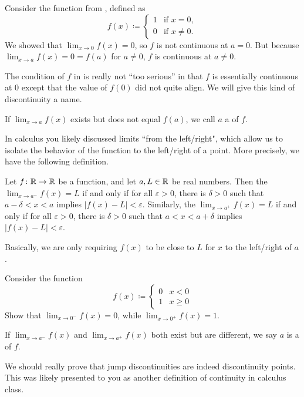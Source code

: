 \documentclass[../notes.tex]{subfiles}
\begin{document}
\begin{example} \label{ex:rem-discont-2}
    Consider the function from , defined as
    \[ f(x) \coloneqq \begin{cases}
        1 & \text{if }x=0, \\
        0 & \text{if }x\neq 0.
    \end{cases}\]
    We showed that $\lim_{x\to 0}f(x) =0$, so $f$ is not continuous at $a=0$. But because $\lim_{x\to a}f(x)=0=f(a)$ for $a\neq 0$, $f$ is continuous at $a\neq 0$. 
\end{example}
The condition of $f$ in  is really not ``too serious'' in that $f$ is essentially continuous at $0$ except that the value of $f(0)$ did not quite align. We will give this kind of discontinuity a name.
\begin{definition}
    If $\lim_{x\to a}f(x)$ exists but does not equal $f(a)$, we call $a$ a  of $f$. 
\end{definition}
In calculus you likely discussed limits ``from the left/right", which allow us to isolate the behavior of the function to the left/right of a point. More precisely, we have the following definition.

\begin{definition}
    Let $f\colon\mathbb R\to \mathbb R$ be a function, and let $a,L\in \mathbb R$ be real numbers. Then the  $\lim_{x\to a^-}f(x)=L$ if and only if for all $\varepsilon>0$, there is $\delta>0$ such that $a-\delta < x < a$ implies $|f(x)-L| < \varepsilon$. Similarly, the  $\lim_{x\to a^+}f(x)=L$ if and only if for all $\varepsilon>0$, there is $\delta>0$ such that $a < x < a+\delta$ implies $|f(x)-L| < \varepsilon$.
\end{definition}
Basically, we are only requiring $f(x)$ to be close to $L$ for $x$ to the left/right of $a$. 

\begin{exe}
    Consider the function 
    \[ f(x) \coloneqq \begin{cases}
        0 & x < 0 \\
        1 & x \geq 0
    \end{cases}\]
    Show that $\lim_{x\to 0^-}f(x) = 0$, while $\lim_{x\to 0^+}f(x) = 1$. 
\end{exe}

\begin{definition}
    If $\lim_{x\to a^-}f(x)$ and  $\lim_{x\to a^+}f(x)$ both exist but are different, we say $a$ is a  of $f$.
\end{definition}
We should really prove that jump discontinuities are indeed discontinuity points. This was likely presented to you as another definition of continuity in calculus class.
\end{document}
